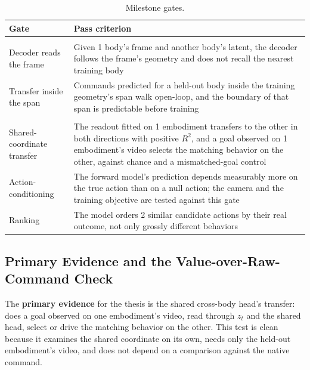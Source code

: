 \documentclass[12pt,a4paper,oneside]{report}
\begin{document}
\begin{table}[H]
\centering
\footnotesize
\setlength{\tabcolsep}{6pt}
\renewcommand{\arraystretch}{1.5}
\caption{Milestone gates.}
\label{tab:gates}
\begin{tabularx}{\textwidth}{>{\hsize}Y>{\hsize}Y}
\toprule
\textbf{Gate} & \textbf{Pass criterion}\\
\midrule
{}\\
\addlinespace[3pt]
Decoder reads the frame & Given 1 body's frame and another body's latent, the decoder follows the frame's geometry and does not recall the nearest training body\\
\addlinespace[3pt]
Transfer inside the span & Commands predicted for a held-out body inside the training geometry's span walk open-loop, and the boundary of that span is predictable before training\\
\addlinespace[3pt]
\\
\addlinespace[3pt]
Shared-coordinate transfer & The readout fitted on 1 embodiment transfers to the other in both directions with positive $R^2$, and a goal observed on 1 embodiment's video selects the matching behavior on the other, against chance and a mismatched-goal control\\
\addlinespace[3pt]
Action-conditioning & The forward model's prediction depends measurably more on the true action than on a null action; the camera and the training objective are tested against this gate\\
\addlinespace[3pt]
Ranking & The model orders 2 similar candidate actions by their real outcome, not only grossly different behaviors\\
\bottomrule
\end{tabularx}
\end{table}

\subsection{Primary Evidence and the Value-over-Raw-Command Check}
The \textbf{primary evidence} for the thesis is the shared cross-body head's transfer: does a goal observed on
one embodiment's video, read through $z_t$ and the shared head, select or drive the matching behavior on the
other. This test is clean because it examines the shared coordinate on its own, needs only the held-out
embodiment's video, and does not depend on a comparison against the native command.
\end{document}
